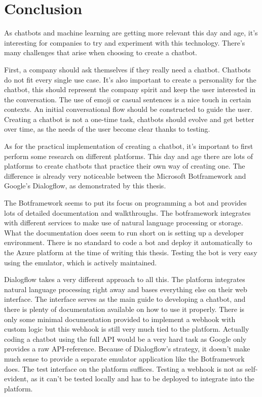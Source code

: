 \chapter*{Conclusion}

As chatbots and machine learning are getting more relevant this day and age, it's interesting for companies to try and experiment with this technology. There's many challenges that arise when choosing to create a chatbot.

First, a company should ask themselves if they really need a chatbot. Chatbots do not fit every single use case. It's also important to create a personality for the chatbot, this should represent the company spirit and keep the user interested in the conversation. The use of emoji or casual sentences is a nice touch in certain contexts. An initial conversational flow should be constructed to guide the user. Creating a chatbot is not a one-time task, chatbots should evolve and get better over time, as the needs of the user become clear thanks to testing.

As for the practical implementation of creating a chatbot, it's important to first perform some research on different platforms. This day and age there are lots of platforms to create chatbots that practice their own way of creating one. The difference is already very noticeable between the Microsoft Botframework and Google's Dialogflow, as demonstrated by this thesis.

The Botframework seems to put its focus on programming a bot and provides lots of detailed documentation and walkthroughs. The botframework integrates with different services to make use of natural language processing or storage. What the documentation does seem to run short on is setting up a developer environment. There is no standard to code a bot and deploy it automatically to the Azure platform at the time of writing this thesis. Testing the bot is very easy using the emulator, which is actively maintained.

Dialogflow takes a very different approach to all this. The platform integrates natural language processing right away and bases everything else on their web interface. The interface serves as the main guide to developing a chatbot, and there is plenty of documentation available on how to use it properly. There is only some minimal documentation provided to implement a webhook with custom logic but this webhook is still very much tied to the platform. Actually coding a chatbot using the full API would be a very hard task as Google only provides a raw API-reference. Because of Dialogflow's strategy, it doesn't make much sense to provide a separate emulator application like the Botframework does. The test interface on the platform suffices. Testing a webhook is not as self-evident, as it can't be tested locally and has to be deployed to integrate into the platform.

